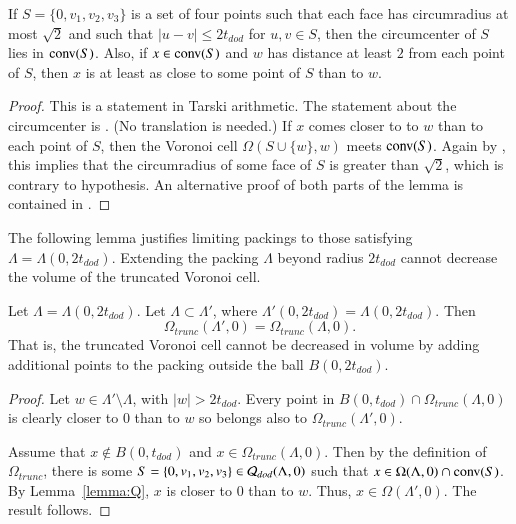 \begin{lemma}\label{lemma:Q}
If $S=\{0,v_1,v_2,v_3\}$ is a set of four points such that each
face has circumradius at most $\sqrt2$ and such that
$|u-v|\le 2t_{dod}$ for $u,v\in S$, then
the circumcenter of $S$ lies in ${\operatorname{conv}}(S)$.  Also, if $x
\in {\operatorname{conv}}(S)$ and $w$ has distance at least $2$ from each
point of $S$, then $x$ is at least as close to some point of $S$ than to
$w$.
\end{lemma}

\begin{proof} This is a statement in Tarski arithmetic.
The statement about the circumcenter is \cite[Lemma~5.18]{DCG}.
(No translation is needed.)
If $x$  comes closer to  to $w$  than to each point of $S$, then
the Voronoi cell $\Omega(S\cup\{w\},w)$ meets ${\operatorname{conv}}(S)$.
Again by \cite[Lemma~5.18]{DCG}, this implies that the circumradius
of some face of $S$ is greater than $\sqrt2$, which is contrary
to hypothesis. An alternative proof 
of both parts of the lemma
is contained in \cite[Lemma~3.5,3.6]{arx}.
\end{proof}

The following lemma justifies limiting packings to those
satisfying $\Lambda=\Lambda(0,2t_{dod})$.  Extending the packing
$\Lambda$ beyond radius $2t_{dod}$ cannot decrease the volume of the
truncated Voronoi cell.

\begin{lemma}\label{lemma:trunc}  
Let $\Lambda=\Lambda(0,2t_{dod})$.  Let $\Lambda\subset\Lambda'$,
where $\Lambda'(0,2t_{dod}) = \Lambda(0,2t_{dod})$.  Then
$$\Omega_{trunc}(\Lambda',0) = \Omega_{trunc}(\Lambda,0).
$$
That is, the truncated Voronoi cell cannot be decreased in volume by
adding additional points to the packing outside the ball $B(0,2t_{dod})$.
\end{lemma}

\begin{proof} Let $w\in \Lambda'\setminus\Lambda$, with $|w|>2t_{dod}$.
Every point in $B(0,t_{dod})\cap \Omega_{trunc}(\Lambda,0)$ 
is clearly closer to $0$ than to $w$ so
belongs also to $\Omega_{trunc}(\Lambda',0)$.

Assume that $x\not\in B(0,t_{dod})$ and $x\in \Omega_{trunc}(\Lambda,0)$.
Then by the definition of $\Omega_{trunc}$,
there is some $S=\{0,v_1,v_2,v_3\}\in {\mathcal Q}_{dod}(\Lambda,0)$ such that
$x\in \Omega(\Lambda,0)\cap {\operatorname{conv}}(S)$.  By Lemma~\ref{lemma:Q},
$x$ is closer to $0$ than to $w$.  Thus, $x\in\Omega(\Lambda',0)$.
The result follows.
\end{proof}

